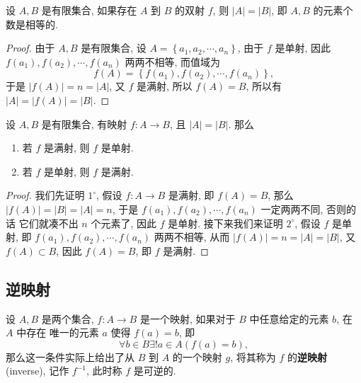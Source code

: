 \documentclass[10pt,UTF8]{book} %
\begin{document}
\setcounter{prop}{0}
\begin{prop}
    设 $A,B$ 是有限集合, 如果存在 $A$ 到 $B$ 的双射 $f$, 则 $|A| = |B|$,
    即 $A,B$ 的元素个数是相等的.
    \begin{proof}
        由于 $A,B$ 是有限集合, 设 $A = \left\{ a_1, a_2, \cdots, a_n \right\}$,
        由于 $f$ 是单射, 因此 $f(a_1), f(a_2), \cdots, f(a_n)$ 两两不相等, 而值域为
        \[ f(A) = \left\{ f(a_1), f(a_2), \cdots, f(a_n) \right\}, \]
        于是 $|f(A)| = n = |A|$, 又 $f$ 是满射, 所以 $f(A) = B$, 所以有
        $|A| = |f(A)| = |B|$.
    \end{proof}
\end{prop}
\begin{prop}
    设 $A,B$ 是有限集合, 有映射 $f: A \to B$, 且 $|A| = |B|$. 那么
    \begin{enumerate}[label=\textup{\arabic*}${}^\circ$, itemsep=0pt]
        \item 若 $f$ 是满射, 则 $f$ 是单射.
        \item 若 $f$ 是单射, 则 $f$ 是满射.
    \end{enumerate}
    \begin{proof}
        我们先证明 $1^\circ$, 假设 $f: A \to B$ 是满射, 即 $f(A) = B$,
         那么 $|f(A)| = |B|
        =|A| = n$, 于是 $f(a_1), f(a_2), \cdots,f(a_n)$ 一定两两不同, 否则的话
        它们就凑不出 $n$ 个元素了, 因此 $f$ 是单射.
        \newline 接下来我们来证明 $2^\circ$, 假设 $f$ 是单射, 
        即 $f(a_1), f(a_2), \cdots, f(a_n)$ 两两不相等, 从而
        $|f(A)| = n = |A| = |B|$, 又 $f(A) \subset B$, 因此 $f(A) = B$, 即 $f$
        是满射.
    \end{proof}
\end{prop}




\subsection{逆映射}

\begin{definition}[逆映射]
    设 $A,B$ 是两个集合,
    $f: A \to B$ 是一个映射, 如果对于 $B$ 中任意给定的元素 $b$, 在 $A$ 中存在
    唯一的元素 $a$ 使得 $f(a) = b$, 即
    \[ \forall b \in B \exists! a \in A \left( f(a) = b \right), \]
    那么这一条件实际上给出了从 $B$ 到 $A$ 的一个映射
    $g$, 将其称为 $f$ 的\textbf{逆映射} (inverse), 记作 $f^{-1}$, 此时称 $f$
    是可逆的.
\end{definition}
\end{document}
